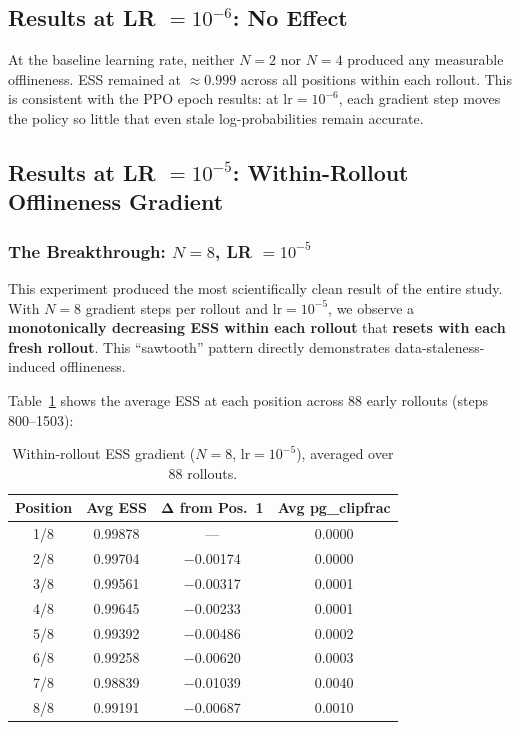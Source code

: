 \documentclass[11pt,a4paper]{article}
\begin{document}
\subsection{Results at LR $= 10^{-6}$: No Effect}

At the baseline learning rate, neither $N=2$ nor $N=4$ produced any measurable
offlineness. ESS remained at $\approx 0.999$ across all positions within each
rollout. This is consistent with the PPO epoch results: at $\mathrm{lr} = 10^{-6}$,
each gradient step moves the policy so little that even stale log-probabilities
remain accurate.

\subsection{Results at LR $= 10^{-5}$: Within-Rollout Offlineness Gradient}

\subsubsection{The Breakthrough: $N = 8$, LR $= 10^{-5}$}

This experiment produced the most scientifically clean result of the entire
study. With $N = 8$ gradient steps per rollout and $\mathrm{lr} = 10^{-5}$,
we observe a \textbf{monotonically decreasing ESS within each rollout} that
\textbf{resets with each fresh rollout}. This ``sawtooth'' pattern directly
demonstrates data-staleness-induced offlineness.

Table~\ref{tab:steps8_ess} shows the average ESS at each position across 88
early rollouts (steps 800--1503):

\begin{table}[H]
\centering
\caption{Within-rollout ESS gradient ($N = 8$, $\mathrm{lr} = 10^{-5}$), averaged over 88 rollouts.}
\label{tab:steps8_ess}
\begin{tabular}{@{}cccc@{}}
\toprule
\textbf{Position} & \textbf{Avg ESS} & $\boldsymbol{\Delta}$ \textbf{from Pos.\ 1} & \textbf{Avg pg\_clipfrac} \\
\midrule
1/8 & 0.99878 &  --- & 0.0000 \\
2/8 & 0.99704 & $-$0.00174 & 0.0000 \\
3/8 & 0.99561 & $-$0.00317 & 0.0001 \\
4/8 & 0.99645 & $-$0.00233 & 0.0001 \\
5/8 & 0.99392 & $-$0.00486 & 0.0002 \\
6/8 & 0.99258 & $-$0.00620 & 0.0003 \\
7/8 & 0.98839 & $-$0.01039 & 0.0040 \\
8/8 & 0.99191 & $-$0.00687 & 0.0010 \\
\bottomrule
\end{tabular}
\end{table}
\end{document}
